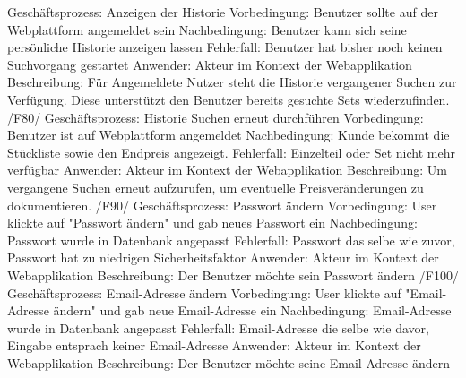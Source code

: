 Geschäftsprozess: Anzeigen der Historie\newline
Vorbedingung: Benutzer sollte auf der Webplattform angemeldet sein\newline
Nachbedingung: Benutzer kann sich seine persönliche Historie anzeigen lassen\newline
Fehlerfall: Benutzer hat bisher noch keinen Suchvorgang gestartet\newline
Anwender: Akteur im Kontext der Webapplikation\newline
Beschreibung: Für Angemeldete Nutzer steht die Historie vergangener Suchen zur Verfügung. Diese unterstützt den Benutzer bereits gesuchte Sets wiederzufinden.\newline\newline
/F80/ \newline
Geschäftsprozess: Historie Suchen erneut durchführen \newline
Vorbedingung: Benutzer ist auf Webplattform angemeldet \newline
Nachbedingung: Kunde bekommt die Stückliste sowie den Endpreis angezeigt.\newline 
Fehlerfall: Einzelteil oder Set nicht mehr verfügbar \newline
Anwender: Akteur im Kontext der Webapplikation \newline
Beschreibung: Um vergangene Suchen erneut aufzurufen, um eventuelle  Preisveränderungen zu dokumentieren. \newline \newline \newline
/F90/ \newline
Geschäftsprozess: Passwort ändern \newline
Vorbedingung: User klickte auf "Passwort ändern" und gab neues Passwort ein \newline
Nachbedingung: Passwort wurde in Datenbank angepasst \newline
Fehlerfall: Passwort das selbe wie zuvor, Passwort hat zu niedrigen Sicherheitsfaktor \newline
Anwender: Akteur im Kontext der Webapplikation \newline
Beschreibung: Der Benutzer möchte sein Passwort ändern \newline \newline
/F100/ \newline
Geschäftsprozess: Email-Adresse ändern \newline
Vorbedingung: User klickte auf "Email-Adresse ändern" und gab neue Email-Adresse ein \newline
Nachbedingung: Email-Adresse wurde in Datenbank angepasst \newline
Fehlerfall: Email-Adresse die selbe wie davor, Eingabe entsprach keiner Email-Adresse \newline
Anwender: Akteur im Kontext der Webapplikation \newline
Beschreibung: Der Benutzer möchte seine Email-Adresse ändern \newline \newline

